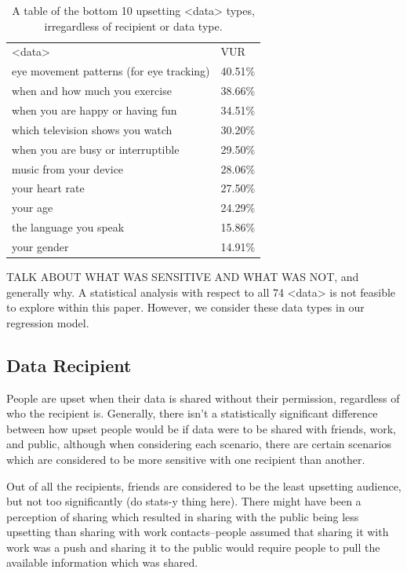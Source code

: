 \documentclass{acm_proc_article-sp}
\begin{document}
\begin{table}%
\begin{center}
\begin{tabular}{ll}
<data> &  VUR  \\
eye movement patterns (for eye tracking) & 40.51\% \\
when and how much you exercise  & 38.66\% \\
when you are happy or having fun  & 34.51\% \\
which television shows you watch & 30.20\% \\
when you are busy or interruptible  & 29.50\% \\
music from your device  & 28.06\% \\
your heart rate & 27.50\% \\
your age & 24.29\% \\
the language you speak & 15.86\% \\
your gender & 14.91\% \\ 

\end{tabular}
\caption{A table of the bottom 10 upsetting <data> types, irregardless of recipient or data type.}
\label{bottom10}
\end{center}
\end{table}

TALK ABOUT WHAT WAS SENSITIVE AND WHAT WAS NOT, and generally why. A statistical analysis with respect to all 74 <data> is not feasible to explore within this paper. However, we consider these data types in our regression model.  

\subsection{Data Recipient}
People are upset when their data is shared without their permission, regardless of who the recipient is. Generally, there isn't a statistically significant difference between how upset people would be if data were to be shared with friends, work, and public, although when considering each scenario, there are certain scenarios which are considered to be more sensitive with one recipient than another.

Out of all the recipients, friends are considered to be the least upsetting audience, but not too significantly (do stats-y thing here). There might have been a perception of sharing which resulted in sharing with the public being less upsetting than sharing with work contacts--people assumed that sharing it with work was a push and sharing it to the public would require people to pull the available information which was shared.
\end{document}
